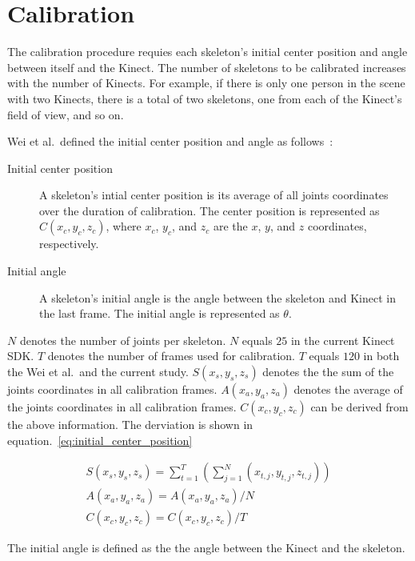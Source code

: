 \section{Calibration}
\label{sec:current_approach_calibration}

The calibration procedure requies each skeleton's initial center position and angle between itself and the Kinect. The number of skeletons to be calibrated increases with the number of Kinects. For example, if there is only one person in the scene with two Kinects, there is a total of two skeletons, one from each of the Kinect's field of view, and so on.

Wei et al.\ defined the initial center position and angle as follows~\cite{wei_kinect_calibration}:

\begin{description}
  \item[Initial center position] A skeleton's intial center position is its average of all joints coordinates over the duration of calibration. The center position is represented as $C(x_c, y_c, z_c)$, where $x_c$, $y_c$, and $z_c$ are the $x$, $y$, and $z$ coordinates, respectively.
  \item[Initial angle] A skeleton's initial angle is the angle between the skeleton and Kinect in the last frame. The initial angle is represented as $\theta$.
\end{description}

$N$ denotes the number of joints per skeleton. $N$ equals $25$ in the current Kinect SDK. $T$ denotes the number of frames used for calibration. $T$ equals $120$ in both the Wei et al.\ and the current study. $S(x_s, y_s, z_s)$ denotes the the sum of the joints coordinates in all calibration frames. $A(x_a, y_a, z_a)$ denotes the average of the joints coordinates in all calibration frames. $C(x_c, y_c, z_c)$ can be derived from the above information. The derviation is shown in equation.~\ref{eq:initial_center_position}

\begin{equation}
\label{eq:initial_center_position}
\begin{gathered}
S(x_s, y_s, z_s) = \sum_{t=1}^T (\sum_{j=1}^N (x_{t,j}, y_{t,j}, z_{t,j})) \\
A(x_a, y_a, z_a) = A(x_a, y_a, z_a) / N \\
C(x_c, y_c, z_c) = C(x_c, y_c, z_c) / T
\end{gathered}
\end{equation}

The initial angle is defined as the the angle between the Kinect and the skeleton.

